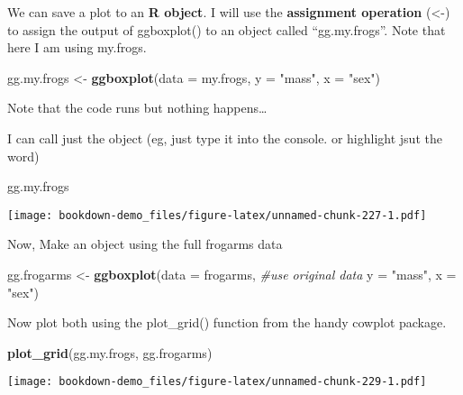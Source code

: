 \documentclass[]{book}
\newenvironment{Shaded}{\begin{snugshade}}{\end{snugshade}}
\newcommand{\KeywordTok}[1]{\textcolor[rgb]{0.13,0.29,0.53}{\textbf{#1}}}
\newcommand{\DataTypeTok}[1]{\textcolor[rgb]{0.13,0.29,0.53}{#1}}
\newcommand{\StringTok}[1]{\textcolor[rgb]{0.31,0.60,0.02}{#1}}
\newcommand{\CommentTok}[1]{\textcolor[rgb]{0.56,0.35,0.01}{\textit{#1}}}
\newcommand{\NormalTok}[1]{#1}
\theoremstyle{definition}
\theoremstyle{definition}
\theoremstyle{definition}
\theoremstyle{remark}
\begin{document}
We can save a plot to an \textbf{R object}. I will use the
\textbf{assignment operation} (\textless{}-) to assign the output of
ggboxplot() to an object called ``gg.my.frogs''. Note that here I am
using my.frogs.

\begin{Shaded}
\begin{Highlighting}[]
\NormalTok{gg.my.frogs <-}\StringTok{ }\KeywordTok{ggboxplot}\NormalTok{(}\DataTypeTok{data =}\NormalTok{ my.frogs,}
          \DataTypeTok{y =} \StringTok{"mass"}\NormalTok{,}
          \DataTypeTok{x =} \StringTok{"sex"}\NormalTok{)}
\end{Highlighting}
\end{Shaded}

Note that the code runs but nothing happens\ldots{}

I can call just the object (eg, just type it into the console. or
highlight jsut the word)

\begin{Shaded}
\begin{Highlighting}[]
\NormalTok{gg.my.frogs}
\end{Highlighting}
\end{Shaded}

\texttt{[image: bookdown-demo\_files/figure-latex/unnamed-chunk-227-1.pdf]}

Now, Make an object using the full frogarms data

\begin{Shaded}
\begin{Highlighting}[]
\NormalTok{gg.frogarms <-}\StringTok{ }\KeywordTok{ggboxplot}\NormalTok{(}\DataTypeTok{data =}\NormalTok{ frogarms, }\CommentTok{#use original data}
          \DataTypeTok{y =} \StringTok{"mass"}\NormalTok{,}
          \DataTypeTok{x =} \StringTok{"sex"}\NormalTok{)}
\end{Highlighting}
\end{Shaded}

Now plot both using the plot\_grid() function from the handy cowplot
package.

\begin{Shaded}
\begin{Highlighting}[]
\KeywordTok{plot_grid}\NormalTok{(gg.my.frogs,}
\NormalTok{          gg.frogarms)}
\end{Highlighting}
\end{Shaded}

\texttt{[image: bookdown-demo\_files/figure-latex/unnamed-chunk-229-1.pdf]}
\end{document}
